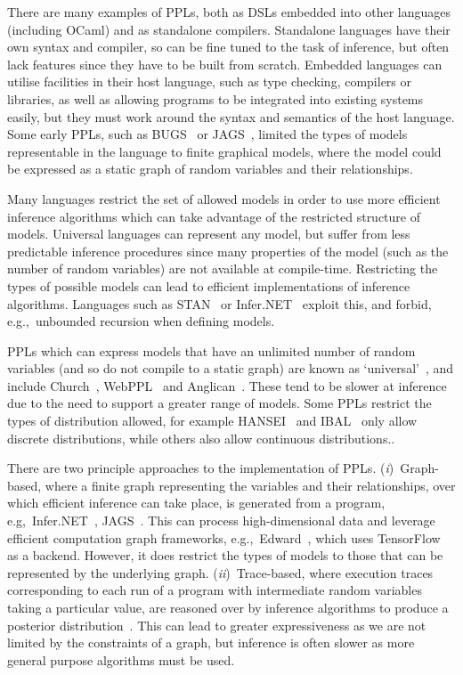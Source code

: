 \documentclass[sigconf,timestamp]{acmart}
\newcommand{\one}{({\em i})\/}
\newcommand{\two}{({\em ii})\/}
\begin{document}
There are many examples of PPLs, both as DSLs embedded into other languages (including OCaml) and as standalone compilers. Standalone languages have their own syntax and compiler, so can be fine tuned to the task of inference, but often lack features since they have to be built from scratch. Embedded languages can utilise facilities in their host language, such as type checking, compilers or libraries, as well as allowing programs to be integrated into existing systems easily, but they must work around the syntax and semantics of the host language. Some early PPLs, such as BUGS~\cite{gilks1994bugs} or JAGS~\cite{plummer2004jags}, limited the types of models representable in the language to finite graphical models, where the model could be expressed as a static graph of random variables and their relationships.

Many languages restrict the set of allowed models in order to use more efficient inference algorithms which can take advantage of the restricted structure of models. Universal languages can represent any model, but suffer from less predictable inference procedures since many properties of the model (such as the number of random variables) are not available at compile-time. Restricting the types of possible models can lead to efficient implementations of inference algorithms. Languages such as STAN~\cite{carpenter2017stan} or Infer.NET~\cite{wang2011using} exploit this, and forbid, e.g.,~unbounded recursion when defining models.

PPLs which can express models that have an unlimited number of random variables (and so do not compile to a static graph) are known as `universal'~\cite{borgstrom2016lambda}, and include Church~\cite{goodman2012church}, WebPPL~\cite{mobus2018structure} and Anglican~\cite{anglican-smc}. These tend to be slower at inference due to the need to support a greater range of models. Some PPLs restrict the types of distribution allowed, for example HANSEI~\cite{kiselyov2009embedded} and IBAL~\cite{ibal} only allow discrete distributions, while others also allow continuous distributions..

There are two principle approaches to the implementation of PPLs. \one~Graph-based, where a finite graph representing the variables and their relationships, over which efficient inference can take place, is generated from a program, e.g,~Infer.NET~\cite{wang2011using}, JAGS~\cite{plummer2004jags}. This can process high-dimensional data and leverage efficient computation graph frameworks, e.g.,~Edward~\cite{edward}, which uses TensorFlow~\cite{tensorflow} as a backend. However, it does restrict the types of models to those that can be represented by the underlying graph. \two~Trace-based, where execution traces corresponding to each run of a program with intermediate random variables taking a particular value, are reasoned over by inference algorithms to produce a posterior distribution~\cite{anglican-smc,mobus2018structure}. This can lead to greater expressiveness as we are not limited by the constraints of a graph, but inference is often slower as more general purpose algorithms must be used.
\end{document}
